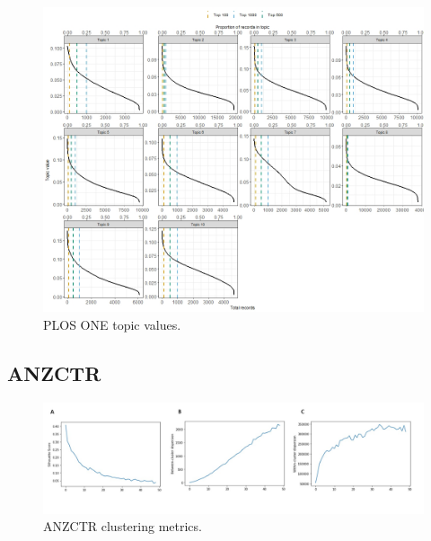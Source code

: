 \documentclass[12pt]{article}
\begin{document}
\begin{figure}

{\centering \includegraphics[width=1\linewidth]{figures/supplementary/plos.topicvalues} 

}

\caption{PLOS ONE topic values.}\label{fig:unnamed-chunk-12}
\end{figure}

\subsection{ANZCTR}

\begin{figure}

{\centering \includegraphics[width=1\linewidth]{figures/supplementary/supp_anzctr.50clusters} 

}

\caption{ANZCTR clustering metrics.}\label{fig:unnamed-chunk-13}
\end{figure}
\end{document}
